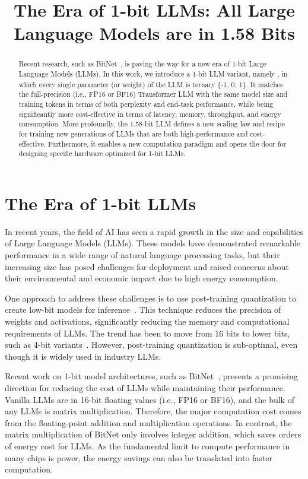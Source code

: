 \title{The Era of 1-bit LLMs: All Large Language Models are in 1.58 Bits}

\begin{abstract}
\vspace{-0.25cm}
Recent research, such as BitNet~\cite{bitnet}, is paving the way for a new era of 1-bit Large Language Models (LLMs). In this work, we introduce a 1-bit LLM variant, namely \textbf{\our{}}, in which every single parameter (or weight) of the LLM is ternary \{-1, 0, 1\}. It matches the full-precision (i.e., FP16 or BF16) Transformer LLM with the same model size and training tokens in terms of both perplexity and end-task performance, while being significantly more cost-effective in terms of latency, memory, throughput, and energy consumption.
More profoundly, the 1.58-bit LLM defines a new scaling law and recipe for training new generations of LLMs that are both high-performance and cost-effective. Furthermore, it enables a new computation paradigm and opens the door for designing specific hardware optimized for 1-bit LLMs.
\end{abstract}

\section{The Era of 1-bit LLMs}

In recent years, the field of AI has seen a rapid growth in the size and capabilities of Large Language Models (LLMs). These models have demonstrated remarkable performance in a wide range of natural language processing tasks, but their increasing size has posed challenges for deployment and raised concerns about their environmental and economic impact due to high energy consumption. 

One approach to address these challenges is to use post-training quantization to create low-bit models for inference~\cite{smoothquant, gptq, quip, quip_sharp}. This technique reduces the precision of weights and activations, significantly reducing the memory and computational requirements of LLMs. The trend has been to move from 16 bits to lower bits, such as 4-bit variants~\cite{gptq, awq}. However, post-training quantization is sub-optimal, even though it is widely used in industry LLMs.

Recent work on 1-bit model architectures, such as BitNet~\cite{bitnet}, presents a promising direction for reducing the cost of LLMs while maintaining their performance. Vanilla LLMs are in 16-bit floating values (i.e., FP16 or BF16), and the bulk of any LLMs is matrix multiplication. Therefore, the major computation cost comes from the floating-point addition and multiplication operations. In contrast, the matrix multiplication of BitNet only involves integer addition, which saves orders of energy cost for LLMs. As the fundamental limit to compute performance in many chips is power, the energy savings can also be translated into faster computation.

